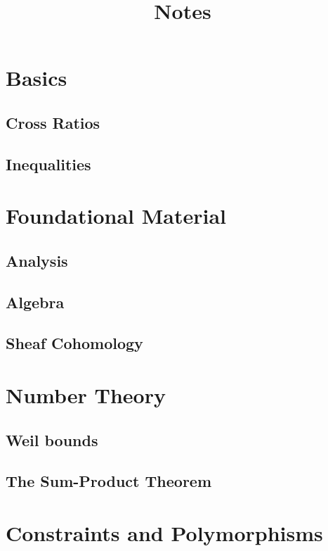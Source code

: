 

\title{Notes}
\date{}
\author{}
\maketitle

\tableofcontents


\part{Basics}

\chapter{Cross Ratios}




\chapter{Inequalities}





\part{Foundational Material}

\chapter{Analysis}




\chapter{Algebra}




\chapter{Sheaf Cohomology}





\part{Number Theory}

\chapter{Weil bounds}




\chapter{The Sum-Product Theorem}




\part{Constraints and Polymorphisms}











